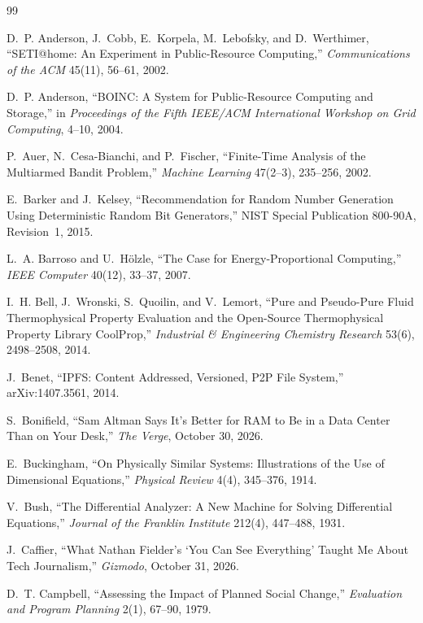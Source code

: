\documentclass[11pt,openany]{book}
\theoremstyle{plain}
\theoremstyle{definition}
\theoremstyle{remark}
\begin{document}
\begin{thebibliography}{99}

D.~P. Anderson, J.~Cobb, E.~Korpela, M.~Lebofsky, and D.~Werthimer,
``SETI@home: An Experiment in Public-Resource Computing,''
\emph{Communications of the ACM} 45(11), 56--61, 2002.

D.~P. Anderson,
``BOINC: A System for Public-Resource Computing and Storage,''
in \emph{Proceedings of the Fifth IEEE/ACM International Workshop on Grid Computing}, 4--10, 2004.

P.~Auer, N.~Cesa-Bianchi, and P.~Fischer,
``Finite-Time Analysis of the Multiarmed Bandit Problem,''
\emph{Machine Learning} 47(2--3), 235--256, 2002.

E.~Barker and J.~Kelsey,
``Recommendation for Random Number Generation Using Deterministic Random Bit Generators,''
NIST Special Publication 800-90A, Revision~1, 2015.

L.~A. Barroso and U.~H\"olzle,
``The Case for Energy-Proportional Computing,''
\emph{IEEE Computer} 40(12), 33--37, 2007.

I.~H. Bell, J.~Wronski, S.~Quoilin, and V.~Lemort,
``Pure and Pseudo-Pure Fluid Thermophysical Property Evaluation and the Open-Source Thermophysical Property Library CoolProp,''
\emph{Industrial \& Engineering Chemistry Research} 53(6), 2498--2508, 2014.

J.~Benet,
``IPFS: Content Addressed, Versioned, P2P File System,''
arXiv:1407.3561, 2014.

S.~Bonifield,
``Sam Altman Says It's Better for RAM to Be in a Data Center Than on Your Desk,''
\emph{The Verge}, October 30, 2026.

E.~Buckingham,
``On Physically Similar Systems: Illustrations of the Use of Dimensional Equations,''
\emph{Physical Review} 4(4), 345--376, 1914.

V.~Bush,
``The Differential Analyzer: A New Machine for Solving Differential Equations,''
\emph{Journal of the Franklin Institute} 212(4), 447--488, 1931.

J.~Caffier,
``What Nathan Fielder's `You Can See Everything' Taught Me About Tech Journalism,''
\emph{Gizmodo}, October 31, 2026.

D.~T. Campbell,
``Assessing the Impact of Planned Social Change,''
\emph{Evaluation and Program Planning} 2(1), 67--90, 1979.


\end{thebibliography}
\end{document}
